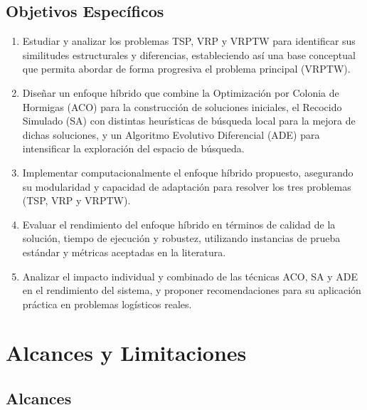 \documentclass[12pt,titlepage,twoside,openright]{book}
\begin{document}
\subsection{Objetivos Específicos}

\begin{enumerate}
    \item Estudiar y analizar los problemas TSP, VRP y VRPTW para identificar sus similitudes estructurales y diferencias, estableciendo así una base conceptual que permita abordar de forma progresiva el problema principal (VRPTW).
    
    \item Diseñar un enfoque híbrido que combine la Optimización por Colonia de Hormigas (ACO) para la construcción de soluciones iniciales, el Recocido Simulado (SA) con distintas heurísticas de búsqueda local para la mejora de dichas soluciones, y un Algoritmo Evolutivo Diferencial (ADE) para intensificar la exploración del espacio de búsqueda.
    
    \item Implementar computacionalmente el enfoque híbrido propuesto, asegurando su modularidad y capacidad de adaptación para resolver los tres problemas (TSP, VRP y VRPTW).
    
    \item Evaluar el rendimiento del enfoque híbrido en términos de calidad de la solución, tiempo de ejecución y robustez, utilizando instancias de prueba estándar y métricas aceptadas en la literatura.
    
    \item Analizar el impacto individual y combinado de las técnicas ACO, SA y ADE en el rendimiento del sistema, y proponer recomendaciones para su aplicación práctica en problemas logísticos reales.
\end{enumerate}


\section{Alcances y Limitaciones}

\subsection*{Alcances}
\end{document}

